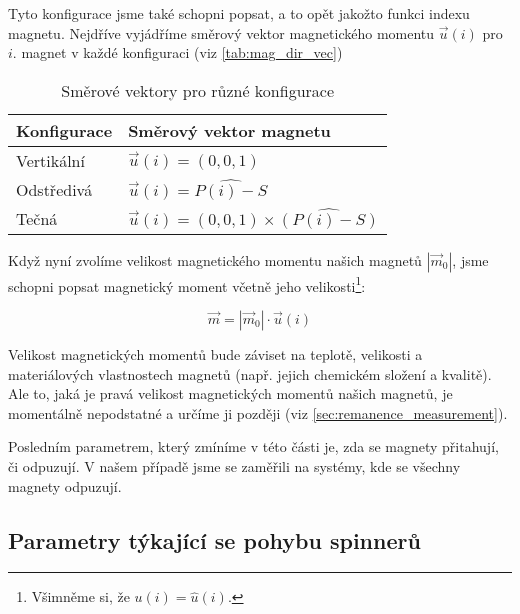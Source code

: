 Tyto konfigurace jsme také schopni popsat, a to opět jakožto funkci indexu magnetu.
Nejdříve vyjádříme směrový vektor magnetického momentu $\vec{u}(i)$ pro $i$. magnet v každé konfiguraci (viz \autoref{tab:mag_dir_vec})

\vspace{24pt}

\begin{table}[!ht]
    \captionsetup{justification=raggedright,singlelinecheck=off}
    \caption{Směrové vektory pro různé konfigurace}
    \label{tab:mag_dir_vec}

    \def\arraystretch{1.5}
    \begin{tabularx}{\textwidth}{p{} p{} }
        \textbf{Konfigurace} & \textbf{Směrový vektor magnetu}                    \\
        \hline
        Vertikální           & $\vec{u}(i) = (0,0,1)$                             \\
        Odstředivá           & $\vec{u}(i) = \widehat{P(i) - S}$                  \\
        Tečná                & $\vec{u}(i) = (0,0,1) \times \widehat{(P(i) - S)}$ \\
    \end{tabularx}
\end{table}

{\raggedright
Když nyní zvolíme velikost magnetického momentu našich magnetů $|\vec{m}_0|$, jsme schopni popsat magnetický moment včetně jeho velikosti\footnote{Všimněme si, že $u(i) = \hat{u}(i)$.}:}

\begin{equation}
    \label{eq:magnet_moment_orientation}
    \vec{m} = |\vec{m}_0| \cdot \vec{u}(i)
\end{equation}

Velikost magnetických momentů bude záviset na teplotě, velikosti a materiálových vlastnostech magnetů (např. jejich chemickém složení a kvalitě). Ale to, jaká je pravá velikost magnetických momentů našich magnetů, je momentálně nepodstatné a určíme ji později (viz \autoref{sec:remanence_measurement}).

Posledním parametrem, který zmíníme v této části je, zda se magnety přitahují, či odpuzují.
V našem případě jsme se zaměřili na systémy, kde se všechny magnety odpuzují.

\subsection{Parametry týkající se pohybu spinnerů}
\label{sub:param_move}

